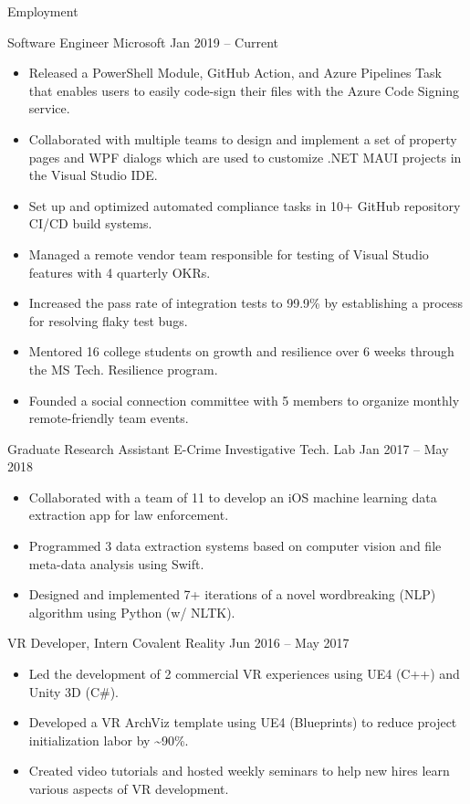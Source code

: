 \documentclass[]{mcdowellcv}
\begin{document}
	\makeheader
	
	\begin{cvsection}{Employment}
		\begin{cvsubsection} {Software Engineer} {Microsoft} {Jan 2019 -- Current}
			\begin{itemize}
				\item Released a PowerShell Module, GitHub Action, and Azure Pipelines Task that enables users to easily code-sign their files with the Azure Code Signing service.
				\item Collaborated with multiple teams to design and implement a set of property pages and WPF dialogs which are used to customize .NET MAUI projects in the Visual Studio IDE.
                \item Set up and optimized automated compliance tasks in 10+ GitHub repository CI/CD build systems.
				\item Managed a remote vendor team responsible for testing of Visual Studio features with 4 quarterly OKRs.
				\item Increased the pass rate of integration tests to 99.9\% by establishing a process for resolving flaky test bugs.	
				\item Mentored 16 college students on growth and resilience over 6 weeks through the MS Tech. Resilience program.
				\item Founded a social connection committee with 5 members to organize monthly remote-friendly team events.
			\end{itemize}
		\end{cvsubsection}

		\begin{cvsubsection} {Graduate Research Assistant} {E-Crime Investigative Tech. Lab} {Jan 2017 -- May 2018}
			\begin{itemize}
				\item Collaborated with a team of 11 to develop an iOS machine learning data extraction app for law enforcement.
				\item Programmed 3 data extraction systems based on computer vision and file meta-data analysis using Swift.
				\item Designed and implemented 7+ iterations of a novel wordbreaking (NLP) algorithm using Python (w/ NLTK).
			\end{itemize}
		\end{cvsubsection}
		
		\begin{cvsubsection} {VR Developer, Intern} {Covalent Reality} {Jun 2016 -- May 2017}
			\begin{itemize}
				\item Led the development of 2 commercial VR experiences using UE4 (C++) and Unity 3D (C\#).
				\item Developed a VR ArchViz template using UE4 (Blueprints) to reduce project initialization labor by \~{}90\%.
				\item Created video tutorials and hosted weekly seminars to help new hires learn various aspects of VR development.
			\end{itemize}
		\end{cvsubsection}
		

\end{cvsection}
\end{document}
